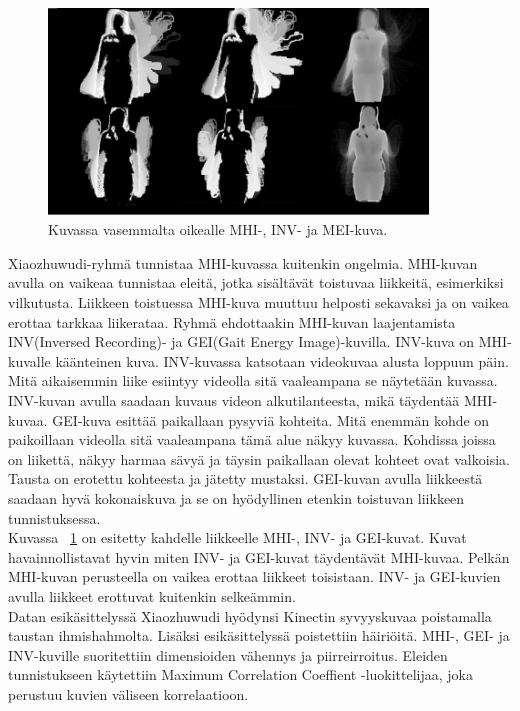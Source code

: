 \begin{figure}[htb]
  \begin{center}
    \includegraphics[width=0.9\textwidth]{mhi_ex.jpg}
    \caption{Kuvassa vasemmalta oikealle MHI-, INV- ja MEI-kuva. \citep {6239179}}
    \label{fig:mhiinvmei}
  \end{center}
\end{figure}

Xiaozhuwudi-ryhmä tunnistaa MHI-kuvassa kuitenkin ongelmia. MHI-kuvan avulla on vaikeaa tunnistaa eleitä, jotka sisältävät toistuvaa liikkeitä, 
esimerkiksi vilkutusta.
Liikkeen toistuessa MHI-kuva muuttuu helposti sekavaksi ja on vaikea erottaa tarkkaa liikerataa. Ryhmä ehdottaakin MHI-kuvan laajentamista 
INV(Inversed Recording)- ja GEI(Gait Energy Image)-kuvilla. INV-kuva on MHI-kuvalle käänteinen kuva. INV-kuvassa katsotaan videokuvaa alusta loppuun päin.
Mitä aikaisemmin liike esiintyy videolla sitä vaaleampana se näytetään kuvassa. INV-kuvan avulla saadaan kuvaus videon alkutilanteesta, mikä täydentää MHI-kuvaa. 
GEI-kuva esittää paikallaan pysyviä kohteita. Mitä enemmän kohde on paikoillaan videolla sitä vaaleampana tämä alue näkyy kuvassa.
Kohdissa joissa on liikettä, näkyy harmaa sävyä ja täysin paikallaan olevat kohteet ovat valkoisia. Tausta on erotettu kohteesta ja jätetty mustaksi. 
GEI-kuvan avulla liikkeestä saadaan hyvä kokonaiskuva ja se on hyödyllinen etenkin toistuvan liikkeen tunnistuksessa. \citep {6239179} \\

Kuvassa ~\ref{fig:mhiinvmei} on esitetty kahdelle
liikkeelle MHI-, INV- ja GEI-kuvat. Kuvat havainnollistavat hyvin miten INV- ja GEI-kuvat
täydentävät MHI-kuvaa. Pelkän MHI-kuvan perusteella on vaikea erottaa liikkeet toisistaan.
INV- ja GEI-kuvien avulla liikkeet erottuvat kuitenkin selkeämmin. \\

Datan esikäsittelyssä Xiaozhuwudi hyödynsi Kinectin syvyyskuvaa poistamalla taustan ihmishahmolta. Lisäksi esikäsittelyssä poistettiin häiriöitä.
MHI-, GEI- ja INV-kuville suoritettiin dimensioiden vähennys ja piirreirroitus. Eleiden tunnistukseen käytettiin Maximum Correlation Coeffient -luokittelijaa,
joka perustuu kuvien väliseen korrelaatioon. \citep{6239179}\\

